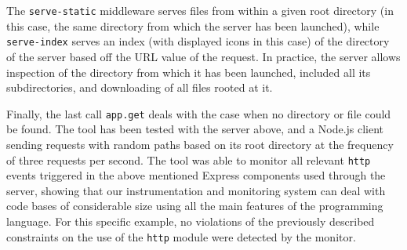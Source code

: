 The  \lstinline{serve-static} middleware serves files from within a given root directory (in this case, the same directory
from which the server has been launched), while \lstinline{serve-index} serves an index (with displayed icons in this case)
of the directory of the server based off the URL value of the request. In practice, the server allows inspection of the directory
from which it has been launched, included all its subdirectories, and downloading of all files rooted at it.

Finally, the last call \lstinline{app.get} deals with the case when no directory or file could be found.
The tool has been tested with the server above, and a Node.js client sending requests with random  paths based on its root directory at the frequency of three requests per second.
The tool was able to monitor all relevant \lstinline{http} events triggered in the above mentioned Express components used through the server, showing that our instrumentation and monitoring system can deal with code bases of considerable size using all the main features of the programming language.
For this specific example, no violations of the previously described constraints on the use of the \lstinline{http} module were detected by the monitor.


